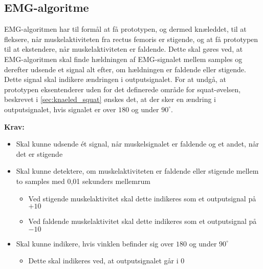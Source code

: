 \subsection{EMG-algoritme}\label{sec:krav_emg_algo}
EMG-algoritmen har til formål at få prototypen, og dermed knæleddet, til at fleksere, når muskelaktiviteten fra rectus femoris er stigende, og at få prototypen til at ekstendere, når muskelaktiviteten er faldende. Dette skal gøres ved, at EMG-algoritmen skal finde hældningen af EMG-signalet mellem samples og derefter udsende et signal alt efter, om hældningen er faldende eller stigende. Dette signal skal indikere ændringen i outputsignalet. 
For at undgå, at prototypen eksentenderer uden for det definerede område for squat-øvelsen, beskrevet i \autoref{sec:knaeled_squat} ønskes det, at der sker en ændring i outputsignalet, hvis signalet er over $180$ og under $90^{\circ}$.

\vspace{3mm}
\textbf{Krav:}
\begin{itemize}
\item Skal kunne udsende ét signal, når muskelsignalet er faldende og et andet, når det er stigende
\item Skal kunne detektere, om muskelaktiviteten er faldende eller stigende mellem to samples med 0,01 sekunders mellemrum
\begin{itemize}
\item Ved stigende muskelaktivitet skal dette indikeres som et outputsignal på $+10$
\item Ved faldende muskelaktivitet skal dette indikeres som et outputsignal på $-10$
\end{itemize}
\item Skal kunne indikere, hvis vinklen befinder sig over $180$ og under $90^{\circ}$
\begin{itemize}
\item Dette skal indikeres ved, at outputsignalet går i $0$
\end{itemize}
\end{itemize}


